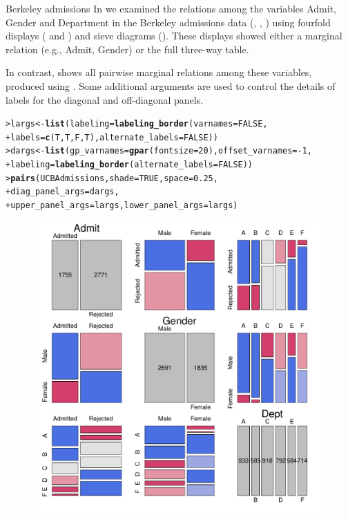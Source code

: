 \documentclass[10pt,krantz2]{krantz}\usepackage[]{graphicx}\usepackage[]{color}
\makeatletter
\newcommand{\hlnum}[1]{\textcolor[rgb]{0.686,0.059,0.569}{#1}}%
\newcommand{\hlopt}[1]{\textcolor[rgb]{0,0,0}{#1}}%
\newcommand{\hlstd}[1]{\textcolor[rgb]{0.345,0.345,0.345}{#1}}%
\newcommand{\hlkwb}[1]{\textcolor[rgb]{0.69,0.353,0.396}{#1}}%
\newcommand{\hlkwc}[1]{\textcolor[rgb]{0.333,0.667,0.333}{#1}}%
\newcommand{\hlkwd}[1]{\textcolor[rgb]{0.737,0.353,0.396}{\textbf{#1}}}%
\newenvironment{kframe}{%
 \def\at@end@of@kframe{}%
 \ifinner\ifhmode%
  \def\at@end@of@kframe{\end{minipage}}%
  \begin{minipage}{\columnwidth}%
 \fi\fi%
 \def\FrameCommand##1{\hskip\@totalleftmargin \hskip-\fboxsep
 \colorbox{shadecolor}{##1}\hskip-\fboxsep
     \hskip-\linewidth \hskip-\@totalleftmargin \hskip\columnwidth}%
 \MakeFramed {\advance\hsize-\width
   \@totalleftmargin\z@ \linewidth\hsize
   \@setminipage}}%
 {\par\unskip\endMakeFramed%
 \at@end@of@kframe}
\newenvironment{knitrout}{}{} %
\renewenvironment{knitrout}{\small\renewcommand{\baselinestretch}{.85}}{} %
\makeatother
\begin{document}
\begin{Example}[berkeley4]{Berkeley admissions}
In  we examined the
relations among the variables Admit, Gender and Department in the Berkeley
admissions data (, , )
using fourfold displays
( and )
and sieve diagrams ().
These displays showed either a marginal relation (e.g., Admit, Gender)
or the full three-way table.

In contrast,  shows all pairwise marginal
relations among these variables, produced using .  Some additional
arguments are used to control the details of labels for the diagonal and off-diagonal panels.
\begin{knitrout}
\color{fgcolor}\begin{kframe}
\begin{alltt}
\hlstd{> }\hlstd{largs} \hlkwb{<-} \hlkwd{list}\hlstd{(}\hlkwc{labeling} \hlstd{=} \hlkwd{labeling_border}\hlstd{(}\hlkwc{varnames} \hlstd{=} \hlnum{FALSE}\hlstd{,}
\hlstd{+ }              \hlkwc{labels} \hlstd{=} \hlkwd{c}\hlstd{(T, T, F, T),} \hlkwc{alternate_labels} \hlstd{=} \hlnum{FALSE}\hlstd{))}
\hlstd{> }\hlstd{dargs} \hlkwb{<-} \hlkwd{list}\hlstd{(}\hlkwc{gp_varnames} \hlstd{=} \hlkwd{gpar}\hlstd{(}\hlkwc{fontsize} \hlstd{=} \hlnum{20}\hlstd{),} \hlkwc{offset_varnames} \hlstd{=} \hlopt{-}\hlnum{1}\hlstd{,}
\hlstd{+ }              \hlkwc{labeling} \hlstd{=} \hlkwd{labeling_border}\hlstd{(}\hlkwc{alternate_labels} \hlstd{=} \hlnum{FALSE}\hlstd{))}
\hlstd{> }\hlkwd{pairs}\hlstd{(UCBAdmissions,} \hlkwc{shade} \hlstd{=} \hlnum{TRUE}\hlstd{,} \hlkwc{space} \hlstd{=} \hlnum{0.25}\hlstd{,}
\hlstd{+ }      \hlkwc{diag_panel_args} \hlstd{= dargs,}
\hlstd{+ }      \hlkwc{upper_panel_args} \hlstd{= largs,} \hlkwc{lower_panel_args} \hlstd{= largs)}
\end{alltt}
\end{kframe}\begin{figure}[!htb]

\centerline{\includegraphics[width=.8\textwidth]{ch05/fig/berk-pairs1-1} }


\end{figure}
\end{knitrout}
\end{Example}
\end{document}
